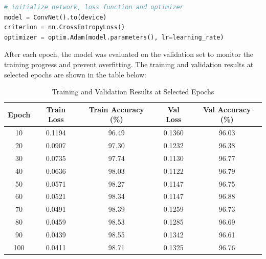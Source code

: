 \documentclass{article}
\begin{document}
\begin{lstlisting}[language=Python]
# initialize network, loss function and optimizer
model = ConvNet().to(device)
criterion = nn.CrossEntropyLoss()
optimizer = optim.Adam(model.parameters(), lr=learning_rate)
\end{lstlisting}

After each epoch, the model was evaluated on the validation set to monitor the training progress and prevent overfitting. The training and validation results at selected epochs are shown in the table below:

\begin{table}[htbp]
    \centering
    \label{tab:training-results}
    \renewcommand{\arraystretch}{1.2} %
    \begin{tabular}{|c|c|c|c|c|}
    \hline
    \textbf{Epoch} & \textbf{Train Loss} & \textbf{Train Accuracy (\%)} & \textbf{Val Loss} & \textbf{Val Accuracy (\%)} \\ \hline
    10             & 0.1194             & 96.49                        & 0.1360            & 96.03                       \\ \hline
    20             & 0.0907             & 97.30                        & 0.1232            & 96.38                       \\ \hline
    30             & 0.0735             & 97.74                        & 0.1130            & 96.77                       \\ \hline
    40             & 0.0636             & 98.03                        & 0.1122            & 96.79                       \\ \hline
    50             & 0.0571             & 98.27                        & 0.1147            & 96.75                       \\ \hline
    60             & 0.0521             & 98.34                        & 0.1147            & 96.88                       \\ \hline
    70             & 0.0491             & 98.39                        & 0.1259            & 96.73                       \\ \hline
    80             & 0.0459             & 98.53                        & 0.1285            & 96.69                       \\ \hline
    90             & 0.0439             & 98.55                        & 0.1342            & 96.61                       \\ \hline
    100            & 0.0411             & 98.71                        & 0.1325            & 96.76                       \\ \hline
    \end{tabular}
    \caption{Training and Validation Results at Selected Epochs}
\end{table}
    
\end{document}

